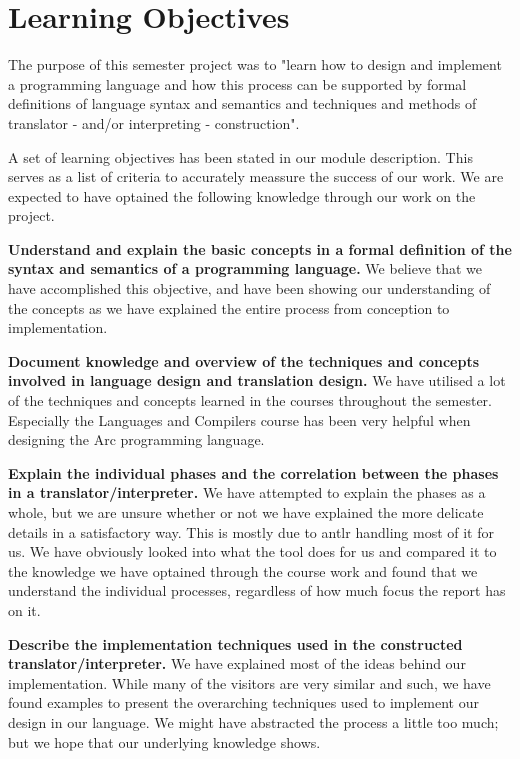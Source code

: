 \section{Learning Objectives}\label{sec:learning_objectives}

The purpose of this semester project was to "learn how to design and implement a programming language and how this process can be supported by formal definitions of language syntax and semantics and techniques and methods of translator - and/or interpreting - construction".

A set of learning objectives has been stated in our module description. This serves as a list of criteria to accurately meassure the success of our work. We are expected to have optained the following knowledge through our work on the project.

\textbf{Understand and explain the basic concepts in a formal definition of the syntax and semantics of a programming language.} We believe that we have accomplished this objective, and have been showing our understanding of the concepts as we have explained the entire process from conception to implementation.

\textbf{Document knowledge and overview of the techniques and concepts involved in language design and translation design.} We have utilised a lot of the techniques and concepts learned in the courses throughout the semester. Especially the Languages and Compilers course has been very helpful when designing the Arc programming language.

\textbf{Explain the individual phases and the correlation between the phases in a translator/interpreter.} We have attempted to explain the phases as a whole, but we are unsure whether or not we have explained the more delicate details in a satisfactory way. This is mostly due to \gls{antlr} handling most of it for us. We have obviously looked into what the tool does for us and compared it to the knowledge we have optained through the course work and found that we understand the individual processes, regardless of how much focus the report has on it.

\textbf{Describe the implementation techniques used in the constructed translator/interpreter.} We have explained most of the ideas behind our implementation. While many of the visitors are very similar and such, we have found examples to present the overarching techniques used to implement our design in our language. We might have abstracted the process a little too much; but we hope that our underlying knowledge shows.

